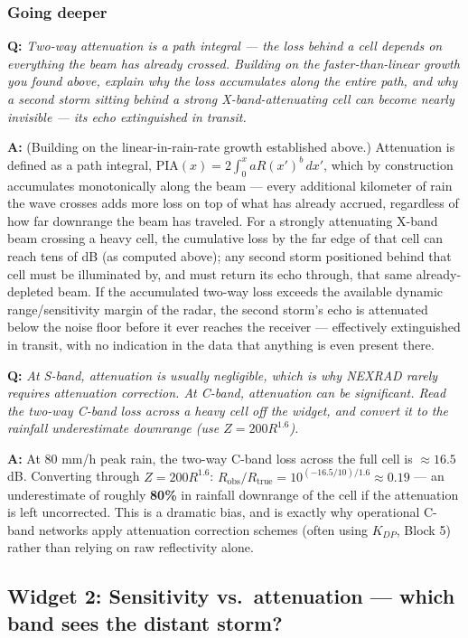 \documentclass[11pt]{article}
\newenvironment{qa}[1]{\par\noindent\textbf{\color{qgray}Q: }\emph{#1}\par\noindent\textbf{A: }}{\par\vspace{6pt}}
\newcommand{\tier}[1]{\subsubsection*{#1}}
\begin{document}
\tier{Going deeper}
\begin{qa}{Two-way attenuation is a path integral --- the loss behind a cell depends on everything the beam has already crossed. Building on the faster-than-linear growth you found above, explain why the loss accumulates along the entire path, and why a second storm sitting behind a strong X-band-attenuating cell can become nearly invisible --- its echo extinguished in transit.}
(Building on the linear-in-rain-rate growth established above.) Attenuation is defined as a path integral, $\mathrm{PIA}(x)=2\int_0^x aR(x')^b\,dx'$, which by construction accumulates monotonically along the beam --- every additional kilometer of rain the wave crosses adds more loss on top of what has already accrued, regardless of how far downrange the beam has traveled. For a strongly attenuating X-band beam crossing a heavy cell, the cumulative loss by the far edge of that cell can reach tens of dB (as computed above); any second storm positioned behind that cell must be illuminated by, and must return its echo through, that same already-depleted beam. If the accumulated two-way loss exceeds the available dynamic range/sensitivity margin of the radar, the second storm's echo is attenuated below the noise floor before it ever reaches the receiver --- effectively extinguished in transit, with no indication in the data that anything is even present there.
\end{qa}
\begin{qa}{At S-band, attenuation is usually negligible, which is why NEXRAD rarely requires attenuation correction. At C-band, attenuation can be significant. Read the two-way C-band loss across a heavy cell off the widget, and convert it to the rainfall underestimate downrange (use $Z=200R^{1.6}$).}
At 80 mm/h peak rain, the two-way C-band loss across the full cell is $\approx16.5$ dB. Converting through $Z=200R^{1.6}$: $R_{\mathrm{obs}}/R_{\mathrm{true}} = 10^{(-16.5/10)/1.6} \approx0.19$ --- an underestimate of roughly \textbf{80\%} in rainfall downrange of the cell if the attenuation is left uncorrected. This is a dramatic bias, and is exactly why operational C-band networks apply attenuation correction schemes (often using $K_{DP}$, Block 5) rather than relying on raw reflectivity alone.
\end{qa}

\subsection{Widget 2: Sensitivity vs.\ attenuation --- which band sees the distant storm?}
\end{document}
